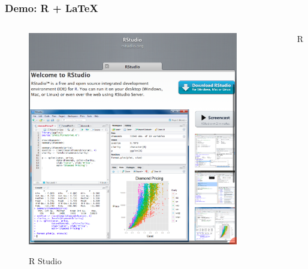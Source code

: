 \begin{frame}[fragile]
    \frametitle{Demo: R + \LaTeX}
    \begin{columns}
        \begin{column}{0.5\textwidth}
            \begin{figure}
                \centering
            \caption{R Studio}
            \href{http://rstudio.org}{
            \includegraphics[width=\textwidth]{images/Rstudio}
            }
        \end{figure}
        \end{column}
        \begin{column}{0.5\textwidth}
            \begin{figure}
                \centering
                        \caption{R}
                    \href{http://www.r-project.org}{
}
\end{figure}
\end{column}
\end{columns}
\end{frame}
